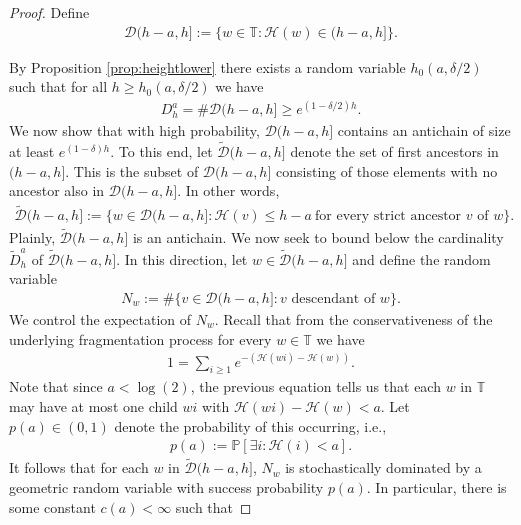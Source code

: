 \documentclass[10pt,a4paper]{amsart}
\begin{document}
	\begin{proof}
		Define
		\begin{align*}
			\mathcal{D}(h-a,h] := \{ w \in \mathbb{T} : \mathcal{H}(w) \in (h-a,h] \}.
		\end{align*}
        
		By Proposition \ref{prop:heightlower} there exists a random variable 
		$h_0(a,\delta/2)$ such that for all $h \geq h_0(a,\delta/2)$ we have
		\begin{align} \label{eq:bc1}
			D_h^a = \# \mathcal{D}(h-a,h] \geq e^{ (1 - \delta/2) h}. 
		\end{align}
		We now show that with high probability, $\mathcal{D}(h-a,h]$ contains 
		an antichain of size at least $e^{(1-\delta)h}$.
		To this end, let $\tilde{\mathcal{D}}(h-a,h]$ denote the set of first ancestors in $(h-a,h]$. 
		This is the subset of $\mathcal{D}(h-a,h]$ consisting of those elements with no 
	ancestor also in $\mathcal{D}(h-a,h]$. In other words,
		\begin{align*}
			\tilde{\mathcal{D}}(h-a,h] := 
			\{w \in \mathcal{D}(h-a,h] : \mathcal{H}(v) \leq h-a ~\text{for every strict ancestor $v$ of $w$} \}.
		\end{align*}
		Plainly, $\tilde{\mathcal{D}}(h-a,h]$ is an antichain. 
		We now seek to bound below the cardinality $\tilde{D}_h^a$ of $\tilde{\mathcal{D}}(h-a,h]$. 
		In this direction, let $w \in \tilde{\mathcal{D}}(h-a,h]$ and define the random variable
		\begin{align*}
			N_w := \# \{ v \in \mathcal{D}(h-a,h] : v \text{ descendant of $w$} \}.
		\end{align*}
		We control the expectation of $N_w$. Recall that from the conservativeness of the underlying fragmentation process for every $w \in \mathbb{T}$ we have
		\begin{align*} 
			1 = \sum_{i \geq 1}e^{ - ( \mathcal{H}(wi) - \mathcal{H}(w) ) }.
		\end{align*}
		Note that since $a < \log(2)$, the previous equation tells us that each $w$ in $\mathbb{T}$ 
		may have at most one child $wi$ with $\mathcal{H}(wi) - \mathcal{H}(w) < a$. 
		Let $p(a) \in (0,1)$ denote the probability of this occurring, i.e.,
		\begin{align*}
			p(a) := \mathbb{P}\left[ \exists i : \mathcal{H}(i)  < a \right].
		\end{align*}
		It follows that for each $w$ in $\tilde{\mathcal{D}}(h-a,h]$, $N_w$ is stochastically dominated by a 
		geometric random variable with success probability $p(a)$. In particular, there is some constant $c(a) < \infty$ such that 

\end{proof}
\end{document}
